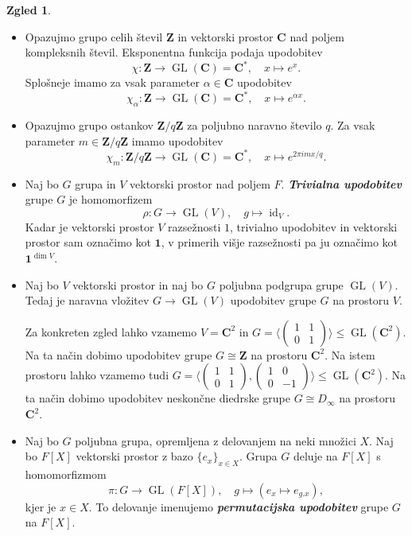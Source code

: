\documentclass[11pt]{book}
\def\ZZ{\mathbf{Z}}
\def\CC{\mathbf{C}}
\def\11{\mathbf{1}}
\DeclareMathOperator\GL{GL}
\DeclareMathOperator\id{id}
\def\definicija{\color{rdeca}\bf\em}
\theoremstyle{definition}
\theoremstyle{zgled}
\newtheorem*{zgled}{Zgled}
\theoremstyle{odprtproblem}
\theoremstyle{domacanaloga}
\theoremstyle{izrek}
\begin{document}
\begin{zgled} \leavevmode
    \begin{itemize}
        \item Opazujmo grupo celih števil $\ZZ$ in vektorski prostor $\CC$ nad poljem kompleksnih števil. Eksponentna funkcija podaja upodobitev
        \[
            \chi \colon \ZZ \to \GL(\CC) = \CC^*, \quad
            x \mapsto e^x.
        \]
        Splošneje imamo za vsak parameter $\alpha \in \CC$ upodobitev
        \[
            \chi_{\alpha} \colon \ZZ \to \GL(\CC) = \CC^*, \quad
            x \mapsto e^{\alpha x}.
        \] 
        \item Opazujmo grupo ostankov $\ZZ/q\ZZ$ za poljubno naravno število $q$. Za vsak parameter $m \in \ZZ/q\ZZ$ imamo upodobitev
        \[
            \chi_m \colon \ZZ/q\ZZ \to \GL(\CC) = \CC^*, \quad
            x \mapsto e^{2 \pi i mx/q}.
        \]
        \item Naj bo $G$ grupa in $V$ vektorski prostor nad poljem $F$. {\definicija Trivialna upodobitev} grupe $G$ je homomorfizem
        \[
            \rho \colon G \to \GL(V), \quad
            g \mapsto \textstyle \id_V.
        \]
        Kadar je vektorski prostor $V$ razsežnosti $1$, trivialno upodobitev in vektorski prostor sam označimo kot $\11$, v primerih višje razsežnosti pa ju označimo kot $\11^{\dim V}$.
        \item Naj bo $V$ vektorski prostor in naj bo $G$ poljubna podgrupa grupe $\GL(V)$. Tedaj je naravna vložitev $G \to \GL(V)$ upodobitev grupe $G$ na prostoru $V$. 
        
        Za konkreten zgled lahko vzamemo $V = \CC^2$ in $G = \langle \left( \begin{smallmatrix} 1 & 1 \\ 0 & 1 \end{smallmatrix} \right) \rangle \leq \GL(\CC^2)$. Na ta način dobimo upodobitev grupe $G \cong \ZZ$ na prostoru $\CC^2$. Na istem prostoru lahko vzamemo tudi $G = \langle 
        \left( \begin{smallmatrix} 1 & 1 \\ 0 & 1 \end{smallmatrix} \right), \left( \begin{smallmatrix} 1 & 0 \\ 0 & -1 \end{smallmatrix} \right) \rangle \leq \GL(\CC^2)$. Na ta način dobimo upodobitev neskončne diedrske grupe $G \cong D_\infty$ na prostoru $\CC^2$.
        \item Naj bo $G$ poljubna grupa, opremljena z delovanjem na neki množici $X$. Naj bo $F[X]$ vektorski prostor z bazo $\{ e_x \}_{x \in X}$. Grupa $G$ deluje na $F[X]$ s homomorfizmom
        \[
            \pi \colon G \to \GL(F[X]), \quad
            g \mapsto \left( e_x \mapsto e_{g.x} \right),
        \]
        kjer je $x \in X$. To delovanje imenujemo {\definicija permutacijska upodobitev} grupe $G$ na $F[X]$. 
        

\end{itemize}
\end{zgled}
\end{document}
